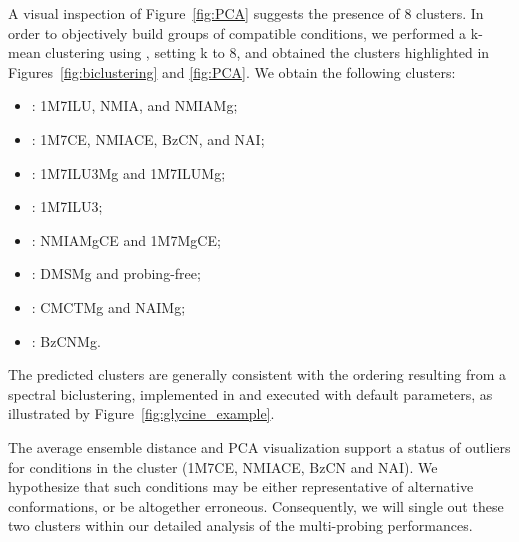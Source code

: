 \documentclass[a4,center,fleqn]{NAR}
\newcommand{\Software}[1]{\text{\ttfamily\bfseries #1}}
\begin{document}
A visual inspection of Figure~\ref{fig:PCA} suggests the presence of 8 clusters. In order to objectively build groups of compatible conditions, we performed a k-mean clustering using \Software{scikit-learn}, setting k to 8, and obtained the clusters highlighted in Figures~\ref{fig:biclustering} and \ref{fig:PCA}.  We obtain the following clusters:
\begin{itemize}\setlength{\itemsep}{0pt}\setlength{\parskip}{.1em}	
\item {}: 1M7ILU, NMIA, and NMIAMg;
\item {}: 1M7CE, NMIACE, BzCN, and NAI;
\item {}: 1M7ILU3Mg and 1M7ILUMg;
\item {}: 1M7ILU3;
\item {}: NMIAMgCE and 1M7MgCE;
\item {}: DMSMg and probing-free;
\item {}: CMCTMg and NAIMg;
\item {}: BzCNMg.
\end{itemize}
The predicted clusters are generally consistent with the ordering resulting from a spectral biclustering, implemented in \Software{scikit-learn} and executed with default parameters, as illustrated by Figure~\ref{fig:glycine_example}. 

The average ensemble distance and PCA visualization support a status of outliers for conditions in the cluster  (1M7CE, NMIACE, BzCN and NAI).  We hypothesize that such conditions may be either representative of alternative conformations, or be altogether erroneous. Consequently, we will single out these two clusters within our detailed analysis of the multi-probing performances.
\end{document}
